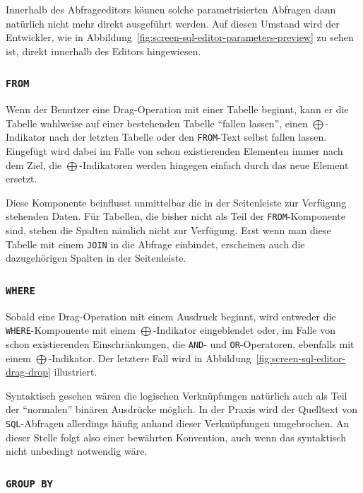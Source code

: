 Innerhalb des Abfrageeditors können solche parametrisierten Abfragen dann natürlich nicht mehr direkt ausgeführt werden. Auf diesen Umstand wird der Entwickler, wie in Abbildung~\ref{fig:screen-sql-editor-parameters-preview} zu sehen ist, direkt innerhalb des Editors hingewiesen.

\subsubsection{\texttt{FROM}}

Wenn der Benutzer eine Drag-Operation mit einer Tabelle beginnt, kann er die Tabelle wahlweise auf einer bestehenden Tabelle "`fallen lassen"', einen $\bigoplus$-Indikator nach der letzten Tabelle oder den \texttt{FROM}-Text selbst fallen lassen. Eingefügt wird dabei im Falle von schon existierenden Elementen immer nach dem Ziel, die $\bigoplus$-Indikatoren werden hingegen einfach durch das neue Element ersetzt.

Diese Komponente beinflusst unmittelbar die in der Seitenleiste zur Verfügung stehenden Daten. Für Tabellen, die bisher nicht als Teil der \texttt{FROM}-Komponente sind, stehen die Spalten nämlich nicht zur Verfügung. Erst wenn man diese Tabelle mit einem \texttt{JOIN} in die Abfrage einbindet, erscheinen auch die dazugehörigen Spalten in der Seitenleiste.

\subsubsection{\texttt{WHERE}}

Sobald eine Drag-Operation mit einem Ausdruck beginnt, wird entweder die \texttt{WHERE}-Komponente mit einem $\bigoplus$-Indikator eingeblendet oder, im Falle von schon existierenden Einschränkungen, die \texttt{AND}- und \texttt{OR}-Operatoren, ebenfalls mit einem $\bigoplus$-Indikator. Der letztere Fall wird in Abbildung~\ref{fig:screen-sql-editor-drag-drop} illustriert.

Syntaktisch gesehen wären die logischen Verknüpfungen natürlich auch als Teil der "`normalen"' binären Ausdrücke möglich. In der Praxis wird der Quelltext von \texttt{SQL}-Abfragen allerdings häufig anhand dieser Verknüpfungen umgebrochen. An dieser Stelle folgt \idename{} also einer bewährten Konvention, auch wenn das syntaktisch nicht unbedingt notwendig wäre.

\subsubsection{\texttt{GROUP BY}}

